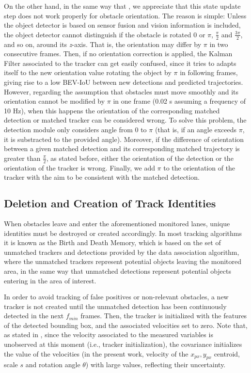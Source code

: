 On the other hand, in the same way that \cite{weng20203d}, we appreciate that this state update step does not work properly for obstacle orientation. The reason is simple: Unless the object detector is based on sensor fusion and vision information is included, the object detector cannot distinguish if the obstacle is rotated 0 or $\pi$, $\frac{\pi}{2}$ and $\frac{3\pi}{2}$, and so on, around its \textit{z}-axis. That is, the orientation may differ by $\pi$ in two consecutive frames. Then, if no orientation correction is applied, the Kalman Filter associated to the tracker can get easily confused, since it tries to adapts itself to the new orientation value rotating the object by $\pi$ in following frames, giving rise to a low BEV-IoU between new detections and predicted trajectories. However, regarding the assumption that obstacles must move smoothly and its orientation cannot be modified by $\pi$ in one frame (0.02 s assuming a frequency of 10 Hz), when this happens the orientation of the corresponding matched detection or matched tracker can be considered wrong. To solve this problem, the detection module only considers angle from 0 to $\pi$ (that is, if an angle exceeds $\pi$, it is substracted to the provided angle). Moreover, if the difference of orientation between a given matched detection and its corresponding matched trajectory is greater than $\frac{\pi}{2}$, as stated before, either the orientation of the detection or the orientation of the tracker is wrong. Finally, we add $\pi$ to the orientation of the tracker with the aim to be consistent with the matched detection. 

\subsection{Deletion and Creation of Track Identities}

When obstacles leave and enter the aforementioned monitored lanes, unique identities must be destroyed or created accordingly. In most tracking algorithms it is known as the Birth and Death Memory, which is based on the set of unmatched trackers and detections provided by the data association algorithm, where the unmatched trackers represent potential objects leaving the monitored area, in the same way that unmatched detections represent potential objects entering in the area of interest. 

In order to avoid tracking of false positives or non-relevant obstacles, a new tracker is not created until the unmatched detection has been continuously detected in the next $f_{min}$ frames. Then, the tracker is initialized with the features of the detected bounding box, and the associated velocities set to zero. Note that, as stated in \cite{bewley2016simple}, since the velocity associated to the measured variables is unobserved at this moment (i.e., tracker initialization), the covariance initializes the value of the velocities (in the present work, velocity of the $x_{px},y_{px}$ centroid, scale $s$ and rotation angle $\theta$) with large values, reflecting their uncertainty. 

